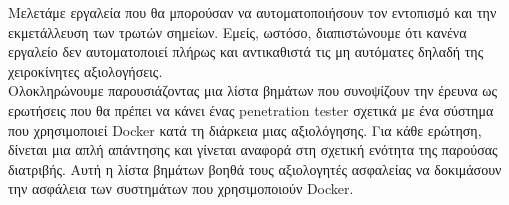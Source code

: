 Μελετάμε εργαλεία που θα μπορούσαν να αυτοματοποιήσουν τον εντοπισμό
και την εκμετάλλευση των τρωτών σημείων. Εμείς, ωστόσο, διαπιστώνουμε
ότι κανένα εργαλείο δεν αυτοματοποιεί πλήρως και αντικαθιστά τις μη
αυτόματες δηλαδή της χειροκίνητες αξιολογήσεις.\mbox{} \\

Ολοκληρώνουμε παρουσιάζοντας μια λίστα βημάτων που συνοψίζουν την έρευνα
ως ερωτήσεις που θα πρέπει να κάνει ένας \textlatin{penetration tester} σχετικά
με ένα σύστημα που χρησιμοποιεί \textlatin{Docker} κατά τη διάρκεια
μιας αξιολόγησης. Για κάθε ερώτηση, δίνεται μια απλή απάντησης  και γίνεται
αναφορά στη σχετική ενότητα της παρούσας διατριβής.
Αυτή η λίστα βημάτων βοηθά τους αξιολογητές ασφαλείας  να δοκιμάσουν την
ασφάλεια των συστημάτων που χρησιμοποιούν \textlatin{Docker}.
